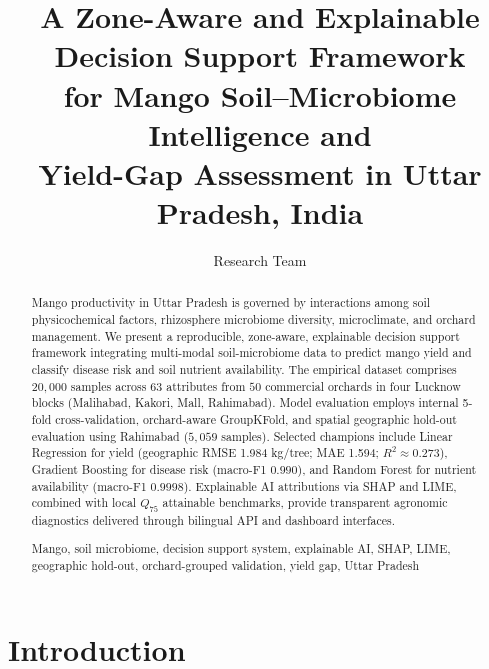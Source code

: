 \documentclass[runningheads,a4paper,oribibl]{llncs}
\newcommand{\keywords}[1]{\par\addvspace\baselineskip
\noindent\keywordname\enspace\ignorespaces#1}
\begin{document}
\mainmatter

\title{A Zone-Aware and Explainable Decision Support Framework\\for Mango Soil--Microbiome Intelligence and\\Yield-Gap Assessment in Uttar Pradesh, India}


\author{Research Team}




\maketitle

\begin{abstract}
Mango productivity in Uttar Pradesh is governed by interactions among soil physicochemical factors, rhizosphere microbiome diversity, microclimate, and orchard management. We present a reproducible, zone-aware, explainable decision support framework integrating multi-modal soil-microbiome data to predict mango yield and classify disease risk and soil nutrient availability. The empirical dataset comprises $20{,}000$ samples across $63$ attributes from $50$ commercial orchards in four Lucknow blocks (Malihabad, Kakori, Mall, Rahimabad). Model evaluation employs internal 5-fold cross-validation, orchard-aware GroupKFold, and spatial geographic hold-out evaluation using Rahimabad ($5{,}059$ samples). Selected champions include Linear Regression for yield (geographic RMSE 1.984 kg/tree; MAE 1.594; $R^2 \approx 0.273$), Gradient Boosting for disease risk (macro-F1 $0.990$), and Random Forest for nutrient availability (macro-F1 $0.9998$). Explainable AI attributions via SHAP and LIME, combined with local $Q_{75}$ attainable benchmarks, provide transparent agronomic diagnostics delivered through bilingual API and dashboard interfaces.

\keywords{Mango, soil microbiome, decision support system, explainable AI, SHAP, LIME, geographic hold-out, orchard-grouped validation, yield gap, Uttar Pradesh}
\end{abstract}


\section{Introduction}
\end{document}
